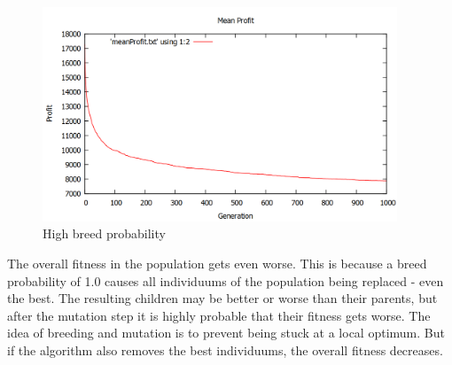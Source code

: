 \documentclass[fontsize=12pt,toc=bibliography, notitlepage]{scrreprt}
\begin{document}
\begin{figure}[H]
	\centering
	\includegraphics[width=400px]{images/breed-high.png}
	\caption{High breed probability}
	\label{fig:breed-high}
\end{figure}
The overall fitness in the population gets even worse. This is because a breed probability of 1.0 causes all individuums of the population being replaced - even the best. The resulting children may be better or worse than their parents, but after the mutation step it is highly probable that their fitness gets worse. The idea of breeding and mutation is to prevent being stuck at a local optimum. But if the algorithm also removes the best individuums, the overall fitness decreases.
\end{document}
